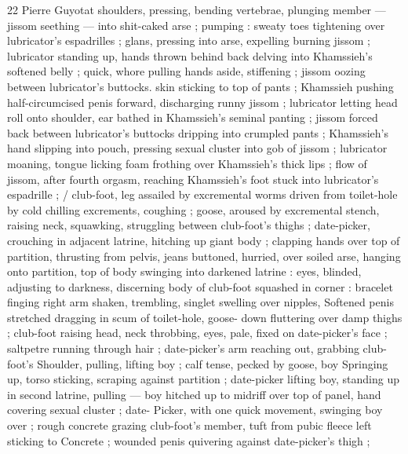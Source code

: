 22 Pierre Guyotat
shoulders, pressing, bending vertebrae, plunging member — jissom
seething — into shit-caked arse ; pumping : sweaty toes tightening
over lubricator's espadrilles ; glans, pressing into arse, expelling
burning jissom ; lubricator standing up, hands thrown behind back
delving into Khamssieh's softened belly ; quick, whore pulling hands
aside, stiffening ; jissom oozing between lubricator's buttocks. skin
sticking to top of pants ; Khamssieh pushing half-circumcised penis
forward, discharging runny jissom ; lubricator letting head roll onto
shoulder, ear bathed in Khamssieh’s seminal panting ; jissom forced
back between lubricator’s buttocks dripping into crumpled pants ;
Khamssieh's hand slipping into pouch, pressing sexual cluster into
gob of jissom ; lubricator moaning, tongue licking foam frothing over
Khamssieh’s thick lips ; flow of jissom, after fourth orgasm, reaching
Khamssieh's foot stuck into lubricator's espadrille ; / club-foot, leg
assailed by excremental worms driven from toilet-hole by cold
chilling excrements, coughing ; goose, aroused by excremental
stench, raising neck, squawking, struggling between club-foot’s
thighs ; date-picker, crouching in adjacent latrine, hitching up giant
body ; clapping hands over top of partition, thrusting from pelvis,
jeans buttoned, hurried, over soiled arse, hanging onto partition, top
of body swinging into darkened latrine : eyes, blinded, adjusting to
darkness, discerning body of club-foot squashed in corner : bracelet
finging right arm shaken, trembling, singlet swelling over nipples,
Softened penis stretched dragging in scum of toilet-hole, goose-
down fluttering over damp thighs ; club-foot raising head, neck
throbbing, eyes, pale, fixed on date-picker's face ; saltpetre running
through hair ; date-picker's arm reaching out, grabbing club-foot’s
Shoulder, pulling, lifting boy ; calf tense, pecked by goose, boy
Springing up, torso sticking, scraping against partition ; date-picker
lifting boy, standing up in second latrine, pulling — boy hitched up
to midriff over top of panel, hand covering sexual cluster ; date-
Picker, with one quick movement, swinging boy over ; rough concrete
grazing club-foot's member, tuft from pubic fleece left sticking to
Concrete ; wounded penis quivering against date-picker's thigh ;


